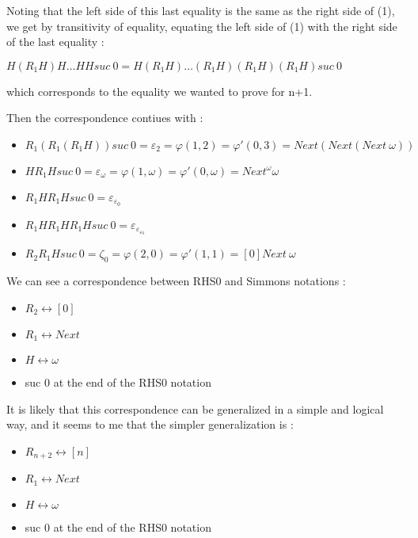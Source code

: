 \documentclass[10pt]{article}
\begin{document}
Noting that the left side of this last equality is the same as the right side of (1), we get by transitivity of equality, equating the left side of (1) with the right side of the last equality :

\( H (R_1 H) H \ldots H H suc\ 0 = H (R_1 H) \ldots (R_1 H) (R_1 H) (R_1 H) suc\ 0  \)

which corresponds to the equality we wanted to prove for n+1.

\bigskip

Then the correspondence contiues with :

\begin{itemize}
     \setlength{\itemsep}{1pt}
     \setlength{\parskip}{0pt}
     \setlength{\parsep}{0pt}

\item \( R_1 (R_1 (R_1 H)) suc\ 0 = \varepsilon_2 = \varphi(1,2) = \varphi'(0,3) = Next (Next (Next\ \omega)) \)
\item \( H R_1 H suc\ 0 = \varepsilon_\omega = \varphi(1,\omega) = \varphi'(0,\omega) = Next^\omega \omega \)
\item \( R_1 H R_1 H suc\ 0 = \varepsilon_{\varepsilon_0} \)
\item \( R_1 H R_1 H R_1 H suc\ 0 = \varepsilon_{\varepsilon_{\varepsilon_0}} \)
\item \( R_2 R_1 H suc\ 0 = \zeta_0 = \varphi(2,0) = \varphi'(1,1) = [0] Next\ \omega \)

\end{itemize}

We can see a correspondence between RHS0 and Simmons notations :

\begin{itemize}
     \setlength{\itemsep}{1pt}
     \setlength{\parskip}{0pt}
     \setlength{\parsep}{0pt}
\item \( R_2 \leftrightarrow [0] \)
\item \( R_1 \leftrightarrow Next \)
\item \( H \leftrightarrow \omega \)
\item suc 0 at the end of the RHS0 notation
\end{itemize}

It is likely that this correspondence can be generalized in a simple and logical way, and it seems to me that the simpler generalization is :

\begin{itemize}
     \setlength{\itemsep}{1pt}
     \setlength{\parskip}{0pt}
     \setlength{\parsep}{0pt}
\item \( R_{n+2} \leftrightarrow [n] \)
\item \( R_1 \leftrightarrow Next \)
\item \( H \leftrightarrow \omega \)
\item suc 0 at the end of the RHS0 notation
\end{itemize}
\end{document}
